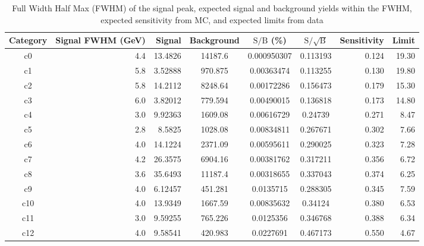 \begin{table}[htb]
  \caption{Full Width Half Max (FWHM) of the signal peak, expected signal and background yields within the FWHM,
           expected sensitivity from MC, and expected limits from data}
  \label{tab:cat_yields}
  \begin{center}
    \begin{tabular}{|c|r|r|c|c|c|r|r|}
      \hline\hline
      Category  & Signal FWHM (GeV) & Signal & Background & $\mathrm{S / B}$ (\%) & $\mathrm{S / \sqrt{B}}$ & Sensitivity & Limit \\  %
      \hline\hline
      c0          &        4.4           &      13.4826         &    14187.6        &     0.000950307    &     0.113193        & 0.124       & 19.30 \\
      c1          &        5.8           &      3.52888         &    970.875        &     0.00363474     &     0.113255        & 0.130       & 19.80 \\
      c2          &        5.8           &      14.2112         &    8248.64        &     0.00172286     &     0.156473        & 0.179       & 15.30 \\
      c3          &        6.0           &      3.82012         &    779.594        &     0.00490015     &     0.136818        & 0.173       & 14.80 \\
      c4          &        3.0           &      9.92363         &    1609.08        &     0.00616729     &     0.24739         & 0.271       &  8.47 \\
      c5          &        2.8           &      8.5825          &    1028.08        &     0.00834811     &     0.267671        & 0.302       &  7.66 \\
      c6          &        4.0           &      14.1224         &    2371.09        &     0.00595611     &     0.290025        & 0.323       &  7.28 \\
      c7          &        4.2           &      26.3575         &    6904.16        &     0.00381762     &     0.317211        & 0.356       &  6.72 \\
      c8          &        3.6           &      35.6493         &    11187.4        &     0.00318655     &     0.337043        & 0.374       &  6.25 \\
      c9          &        4.0           &      6.12457         &    451.281        &     0.0135715      &     0.288305        & 0.345       &  7.59 \\
      c10         &        4.0           &      13.9349         &    1667.59        &     0.00835632     &     0.34124         & 0.380       &  6.53 \\
      c11         &        3.0           &      9.59255         &    765.226        &     0.0125356      &     0.346768        & 0.388       &  6.34 \\
      c12         &        4.0           &      9.58541         &    420.983        &     0.0227691      &     0.467173        & 0.550       &  4.67 \\
      \hline\hline
    \end{tabular}
  \end{center}
\end{table}


